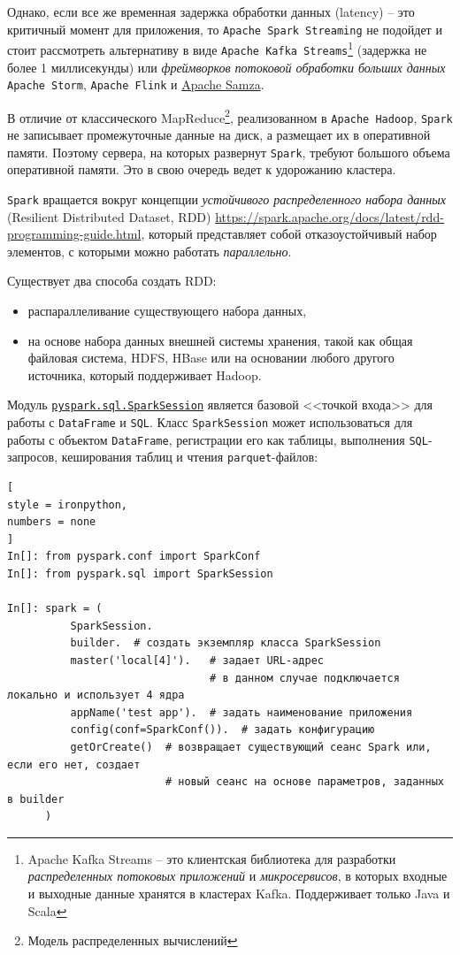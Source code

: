 \documentclass[%
	11pt,
	a4paper,
	utf8,
		]{article}
\begin{document}
Однако, если все же временная задержка обработки данных (latency) -- это критичный момент для приложения, то \texttt{Apache Spark Streaming} не подойдет и стоит рассмотреть альтернативу в виде \texttt{Apache Kafka Streams}\footnote{Apache Kafka Streams -- это клиентская библиотека для разработки \emph{распределенных потоковых приложений} и \emph{микросервисов}, в которых входные и выходные данные хранятся в кластерах Kafka. Поддерживает только Java и Scala} (задержка не более 1 миллисекунды) или \emph{фреймворков потоковой обработки больших данных} \texttt{Apache Storm}, \texttt{Apache Flink} и \href{https://samza.apache.org/}{\ttfamily Apache Samza}.

В отличие от классического MapReduce\footnote{Модель распределенных вычислений}, реализованном в \texttt{Apache Hadoop}, \texttt{Spark} не записывает промежуточные данные на диск, а размещает их в оперативной памяти. Поэтому сервера, на которых развернут \texttt{Spark}, требуют большого объема оперативной памяти. Это в свою очередь ведет к удорожанию кластера. 

\texttt{Spark} вращается вокруг концепции \emph{устойчивого распределенного набора данных} (Resilient Distributed Dataset, {RDD}) \url{https://spark.apache.org/docs/latest/rdd-programming-guide.html}, который представляет собой отказоустойчивый набор элементов, с которыми можно работать \emph{параллельно}.

Существует два способа создать RDD:

\begin{itemize}
	\item распараллеливание существующего набора данных,
	
	\item на основе набора данных внешней системы хранения, такой как общая файловая система, HDFS, HBase или на основании любого другого источника, который поддерживает Hadoop.
\end{itemize}

Модуль \href{https://spark.apache.org/docs/latest/api/python/pyspark.sql.html?highlight=read%20csv}{\texttt{pyspark.sql.SparkSession}} является базовой <<точкой входа>> для работы с \texttt{DataFrame} и \texttt{SQL}. Класс \texttt{SparkSession} может использоваться для работы с объектом \texttt{DataFrame}, регистрации его как таблицы, выполнения \texttt{SQL}-запросов, кеширования таблиц и чтения \texttt{parquet}-файлов:

\begin{lstlisting}[
style = ironpython,
numbers = none
]
In[]: from pyspark.conf import SparkConf
In[]: from pyspark.sql import SparkSession

In[]: spark = (
          SparkSession.
          builder.  # создать экземпляр класса SparkSession
          master('local[4]').   # задает URL-адрес
                                # в данном случае подключается локально и использует 4 ядра
          appName('test app').  # задать наименование приложения
          config(conf=SparkConf()).  # задать конфигурацию
          getOrCreate()  # возвращает существующий сеанс Spark или, если его нет, создает
                         # новый сеанс на основе параметров, заданных в builder
      )
\end{lstlisting}
\end{document}

